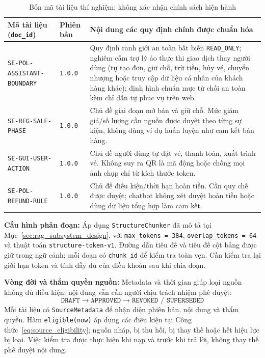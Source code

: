 \begin{table}[!htbp]
\centering
\caption{Bốn mã tài liệu thí nghiệm; không xác nhận chính sách hiện hành}
\label{tab:4_policy_docs_detail}
\small
\begin{tabularx}{\textwidth}{|L{4.8cm}|C{2.0cm}|X|}
\hline
{}
\textbf{Mã tài liệu (\texttt{doc\_id})} & \textbf{Phiên bản} & \textbf{Nội dung các quy định chính được chuẩn hóa} \\
\hline
\texttt{SE-POL-ASSISTANT-\allowbreak BOUNDARY} & \texttt{1.0.0} & Quy định ranh giới an toàn bất biến \texttt{READ\_ONLY}; nghiêm cấm trợ lý ảo thực thi giao dịch thay người dùng (tự tạo đơn, giữ chỗ, trừ tiền, hủy vé, chuyển nhượng hoặc truy cập dữ liệu cá nhân của khách hàng khác); định hình chuẩn mực từ chối an toàn kèm chỉ dẫn tự phục vụ trên web. \\
\hline
\texttt{SE-REG-SALE-PHASE} & \texttt{1.0.0} & Chủ đề giai đoạn mở bán và giữ chỗ. Mức giảm giá/số lượng cần nguồn được duyệt theo từng sự kiện, không dùng ví dụ huấn luyện như cam kết bán hàng. \\
\hline
\texttt{SE-GUI-USER-ACTION} & \texttt{1.0.0} & Chủ đề người dùng tự đặt vé, thanh toán, xuất trình vé. Không suy ra QR là mã động hoặc chống mọi ảnh chụp chỉ từ kích thước token. \\
\hline
\texttt{SE-POL-REFUND-RULE} & \texttt{1.0.0} & Chủ đề điều kiện/thời hạn hoàn tiền. Cần quy chế được duyệt; chatbot không xét duyệt hoàn tiền hoặc dùng dữ liệu tổng hợp làm cam kết. \\
\hline
\end{tabularx}
\end{table}

\noindent\textbf{Cấu hình phân đoạn:} Áp dụng \texttt{StructureChunker} đã mô tả tại Mục~\ref{sec:rag_subsystem_design}, với \texttt{max\_tokens = 384}, \texttt{overlap\_tokens = 64} và thuật toán \texttt{structure-token-v1}. Đường dẫn tiêu đề và tiêu đề cột bảng được giữ trong ngữ cảnh; mỗi đoạn có \texttt{chunk\_id} để kiểm tra toàn vẹn. Cần kiểm tra lại giới hạn token và tính đầy đủ của điều khoản sau khi chia đoạn.

\noindent\textbf{Vòng đời và thẩm quyền nguồn:} Metadata và thời gian giúp loại nguồn không đủ điều kiện; nội dung vẫn cần người chịu trách nhiệm phê duyệt:
$$\texttt{DRAFT} \longrightarrow \texttt{APPROVED} \longrightarrow \texttt{REVOKED / SUPERSEDED}$$
Mỗi tài liệu có \texttt{SourceMetadata} để nhận diện phiên bản, nội dung và thẩm quyền. Hàm \texttt{eligible(now)} áp dụng các điều kiện tại Công thức~\ref{eq:source_eligibility}; nguồn nháp, bị thu hồi, bị thay thế hoặc hết hiệu lực bị loại. Việc kiểm tra được thực hiện khi nạp và trước khi trả lời, không thay thế phê duyệt nội dung.

